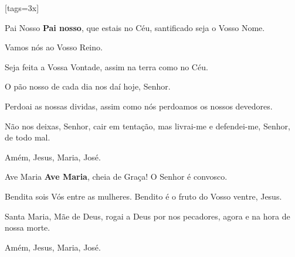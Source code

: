     \scleardpage
    \begin{songs}{}
      \renewcommand{\thesongnum}{\Roman{songnum}}
      \setcounter{songnum}{1}

      [tags={3x}]
        \vspace*{6ex}
        \begin{passage}[PT]{Pai Nosso}
          \textbf{Pai nosso},
          que estais no Céu,
          santificado seja o Vosso Nome.
          \par
          Vamos nós ao Vosso Reino.
          \par
          Seja feita a Vossa Vontade,
          assim na terra como no Céu.
          \par
          O pão nosso de cada dia nos daí hoje, Senhor.
          \par
          Perdoai as nossas dividas,
          assim como nós perdoamos os nossos devedores.
          \par
          Não nos deixas, Senhor, cair em tentação,
          mas livrai-me e defendei-me, Senhor,
          de todo mal.
          \par
          Amém, Jesus, Maria, José.
        \end{passage}
        \begin{passage}[PT]{Ave Maria}
          \textbf{Ave Maria},
          cheia de Graça!
          O Senhor é convosco.
          \par
          Bendita sois Vós entre as mulheres.
          Bendito é o fruto do Vosso ventre, Jesus.
          \par
          Santa Maria, Mãe de Deus,
          rogai a Deus por nos pecadores,
          agora e na hora de nossa morte.
          \par
          Amém, Jesus, Maria, José.
        \end{passage}
        \vspace{\fill}

\end{songs}
